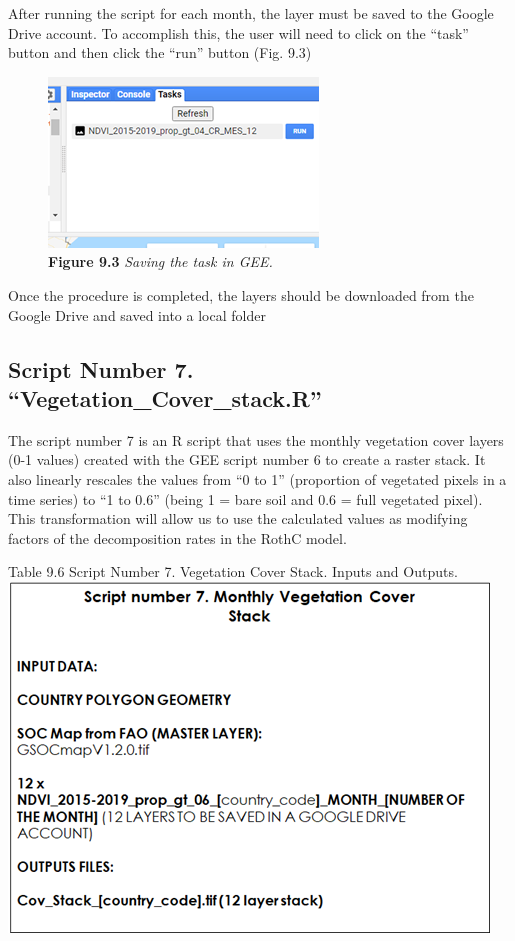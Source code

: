 \documentclass[
  10pt,
  b5paper,
]{book}
\begin{document}
After running the script for each month, the layer must be saved to the Google Drive account. To accomplish this, the user will need to click on the ``task'' button and then click the ``run'' button (Fig. 9.3)

\begin{figure}
\centering
\includegraphics{images/Figure_9.3.png}
\caption{\textbf{Figure 9.3} \emph{Saving the task in GEE.}}
\end{figure}

Once the procedure is completed, the layers should be downloaded from the Google Drive and saved into a local folder

\hypertarget{script-number-7.-vegetation_cover_stack.r}{%
\subsection{Script Number 7. ``Vegetation\_Cover\_stack.R''}\label{script-number-7.-vegetation_cover_stack.r}}

The script number 7 is an R script that uses the monthly vegetation cover layers (0-1 values) created with the GEE script number 6 to create a raster stack. It also linearly rescales the values from ``0 to 1'' (proportion of vegetated pixels in a time series) to ``1 to 0.6'' (being 1 = bare soil and 0.6 = full vegetated pixel). This transformation will allow us to use the calculated values as modifying factors of the decomposition rates in the RothC model.

Table 9.6 Script Number 7. Vegetation Cover Stack. Inputs and Outputs.
\includegraphics{tables/Table_9.6.png}
\end{document}
